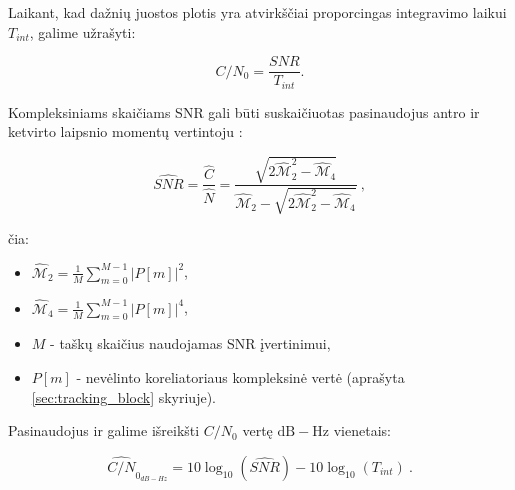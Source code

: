 \documentclass[main.tex]{subfiles}
\begin{document}
Laikant, kad dažnių juostos plotis yra atvirkščiai proporcingas integravimo laikui $T_{int}$,
galime užrašyti:

\begin{equation}
    C/N_0 = \frac{SNR}{T_{int}}.
    \label{eq:snr_integration}
\end{equation}

Kompleksiniams skaičiams SNR gali būti suskaičiuotas pasinaudojus antro ir ketvirto
laipsnio momentų vertintoju \cite{871393}:

\begin{equation}
    \widehat{SNR} = \frac{\hat{C}}{\hat{N}} = \frac{\sqrt{2 \hat{\mathcal{M}}_2^2 - \hat{\mathcal{M}}_4 }}{\hat{\mathcal{M}}_2 - \sqrt{2 \hat{\mathcal{M}}_2^2 - \hat{\mathcal{M}}_4 }}~,
    \label{eq:snr_moment}
\end{equation}

\noindent čia:
\begin{itemize}
    \item $\hat{\mathcal{M}}_2 = \frac{1}{M} \sum^{M-1}_{m=0}{\left| P[m] \right|^2}$, 
    \item $\hat{\mathcal{M}}_4 = \frac{1}{M} \sum^{M-1}_{m=0}{\left| P[m] \right|^4}$,
    \item $M$ - taškų skaičius naudojamas SNR įvertinimui,
    \item $P[m]$ - nevėlinto koreliatoriaus kompleksinė vertė (aprašyta \ref{sec:tracking_block} skyriuje).
\end{itemize}

Pasinaudojus  ir  galime išreikšti
$C/N_0$ vertę $\mathrm{dB-Hz}$ vienetais:

\begin{equation}
    \widehat{C/N}_{0_{dB-Hz}} = 10\log_{10}(\widehat{SNR})-10\log_{10}(T_{int})~.
\end{equation}
\end{document}
